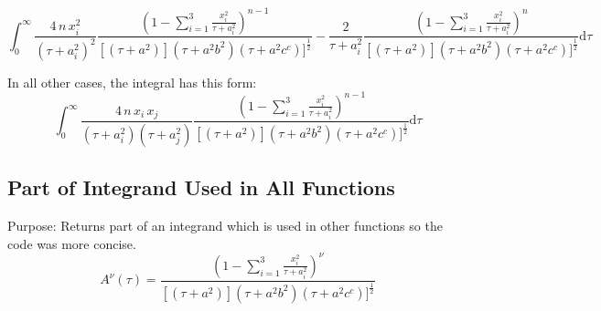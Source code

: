 \documentclass[a4paper,11pt]{article}
\begin{document}
		\begin{equation}
		\int_{0}^{\infty} 
		 \frac{4\,n\,x_i^2}{(\tau + a_i^2)^2} \frac{\left(1- \sum_{i=1}^{3} \frac{x_i^2}{\tau + a_i^2}\right)^{n-1}}{[(\tau + a^2)](\tau + a^2b^2)(\tau + a^2c^c)]^\frac{1}{2}}
		- \frac{2}{\tau + a_i^2} \frac{\left(1- \sum_{i=1}^{3} \frac{x_i^2}{\tau + a_i^2}\right)^{n}}{[(\tau + a^2)](\tau + a^2b^2)(\tau + a^2c^c)]^\frac{1}{2}} \mathrm{d}\tau
		\end{equation}
		
			In all other cases, the integral has this form:
		\begin{equation}
		\int_{0}^{\infty} 
		\frac{4\,n\,x_i\,x_j}{(\tau + a_i^2)(\tau + a_j^2)} \frac{\left(1- \sum_{i=1}^{3} \frac{x_i^2}{\tau + a_i^2}\right)^{n-1}}{[(\tau + a^2)](\tau + a^2b^2)(\tau + a^2c^c)]^\frac{1}{2}} \mathrm{d}\tau
		\end{equation}	
			
			
		
	
		\subsection{Part of Integrand Used in All Functions}
			Purpose: Returns part of an integrand which is used in other functions so the code was more concise. \\
		\begin{equation}
		A^{\nu}(\tau) = \frac{\left(1- \sum_{i=1}^{3} \frac{x_i^2}{\tau + a_i^2}\right)^{\nu}}{[(\tau + a^2)](\tau + a^2b^2)(\tau + a^2c^c)]^\frac{1}{2}}
		\end{equation}
			
	
	
	
\end{document}
